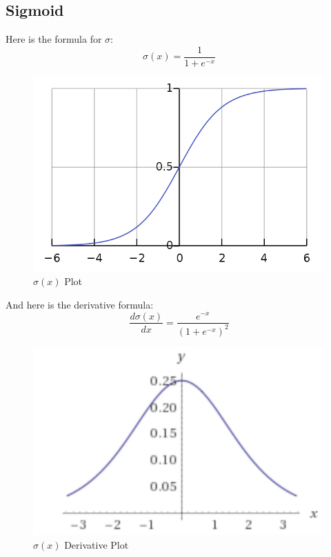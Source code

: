 \subsection{Sigmoid}
Here is the formula for $\sigma$: 
\begin{equation}
    \sigma(x) = \frac{1}{1 + e^{-x}}
\end{equation}

\begin{figure}[!htb]
    \centering
    \includegraphics[scale=0.3]{images/640px-Logistic-curve.png}
    \caption{$\sigma(x)$ Plot}
\end{figure}

And here is the derivative formula: 
\begin{equation}
    \frac{d \sigma(x)}{dx} =  \frac{e^{-x}}{(1 + e^{-x})^2}
\end{equation}

\begin{figure}[!htb]
    \centering
    \includegraphics[scale=0.8]{images/sigmoidderivative.JPG}
    \caption{$\sigma(x)$ Derivative Plot}
\end{figure}

